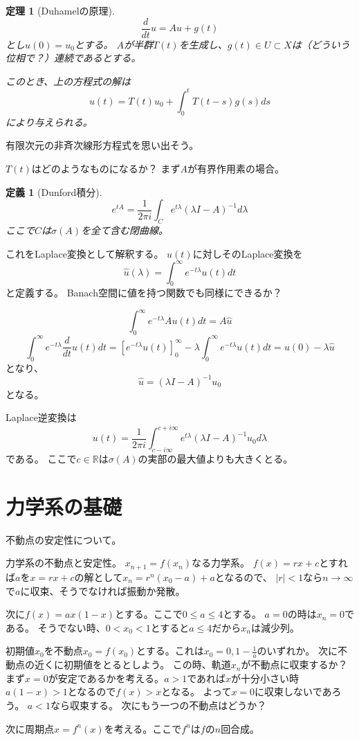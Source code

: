 \documentclass{jsarticle}
\newtheorem{dfn}{定義}
\newtheorem{thm}{定理}
\newcommand{\R}{\mathbb{R}}
\newcommand{\abs}[1]{|#1|}
\begin{document}
\begin{thm}[Duhamelの原理]
\[
\frac{d}{dt}u=Au+g(t)
\]
とし$u(0)=u_0$とする。
$A$が半群$T(t)$を生成し、$g(t)\in U\subset X$は（どういう位相で？）連続であるとする。

このとき、上の方程式の解は
\[
u(t)=T(t)u_0+\int^t_0T(t-s)g(s)ds
\]
により与えられる。
\end{thm}
有限次元の非斉次線形方程式を思い出そう。

$T(t)$はどのようなものになるか？
まず$A$が有界作用素の場合。
\begin{dfn}[Dunford積分]
\[
e^{tA}=\frac{1}{2\pi i}\int_Ce^{t\lambda}(\lambda I-A)^{-1}d\lambda
\]
ここで$C$は$\sigma(A)$を全て含む閉曲線。
\end{dfn}

これをLaplace変換として解釈する。
$u(t)$に対しそのLaplace変換を
\[
\hat{u}(\lambda)=\int^\infty_0e^{-t\lambda}u(t)dt
\]
と定義する。
Banach空間に値を持つ関数でも同様にできるか？

\[
\int^\infty_0e^{-t\lambda}Au(t)dt=A\hat{u}
\]
\[
\int^\infty_0e^{-t\lambda}\frac{d}{dt}u(t)dt=[e^{-t\lambda}u(t)]^\infty_0-\lambda\int^\infty_0e^{-t\lambda}u(t)dt
=u(0)-\lambda\hat{u}
\]
となり、
\[
\hat{u}=(\lambda I-A)^{-1}u_0
\]
となる。

Laplace逆変換は
\[
u(t)=\frac{1}{2\pi i}\int^{c+i\infty}_{c-i\infty}e^{t\lambda}(\lambda I-A)^{-1}u_0d\lambda
\]
である。
ここで$c\in\R$は$\sigma(A)$の実部の最大値よりも大きくとる。

\section{力学系の基礎}
不動点の安定性について。

力学系の不動点と安定性。
$x_{n+1}=f(x_n)$なる力学系。
$f(x)=rx+c$とすれば$a$を$x=rx+c$の解として$x_n=r^n(x_0-a)+a$となるので、
$\abs{r}<1$なら$n\to\infty$で$a$に収束、そうでなければ振動か発散。

次に$f(x)=ax(1-x)$とする。ここで$0\leq a\leq 4$とする。
$a=0$の時は$x_n=0$である。
そうでない時、$0<x_0<1$とすると$a\leq4$だから$x_n$は減少列。

初期値$x_0$を不動点$x_0=f(x_0)$とする。これは$x_0=0, 1-\frac{1}{a}$のいずれか。
次に不動点の近くに初期値をとるとしよう。
この時、軌道$x_n$が不動点に収束するか？
まず$x=0$が安定であるかを考える。$a>1$であれば$x$が十分小さい時$a(1-x)>1$となるので$f(x)>x$となる。
よって$x=0$に収束しないであろう。
$a<1$なら収束する。
次にもう一つの不動点はどうか？

次に周期点$x=f^n(x)$を考える。ここで$f^n$は$f$の$n$回合成。
\end{document}
